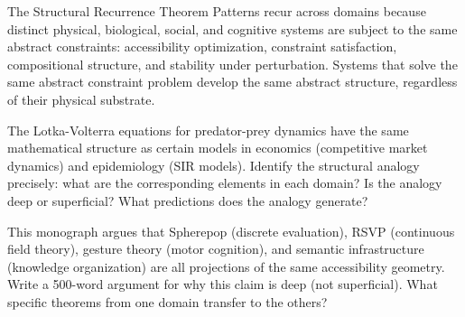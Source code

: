 \begin{namedthm}{The Structural Recurrence Theorem}
  Patterns recur across domains because distinct physical, biological,
  social, and cognitive systems are subject to the same abstract
  constraints: accessibility optimization, constraint satisfaction,
  compositional structure, and stability under perturbation.
  Systems that solve the same abstract constraint problem develop
  the same abstract structure, regardless of their physical substrate.
\end{namedthm}

\begin{exercise}
  The Lotka-Volterra equations for predator-prey dynamics have the
  same mathematical structure as certain models in economics
  (competitive market dynamics) and epidemiology (SIR models).
  Identify the structural analogy precisely: what are the corresponding
  elements in each domain? Is the analogy deep or superficial?
  What predictions does the analogy generate?
\end{exercise}

\begin{exercise}
  This monograph argues that Spherepop (discrete evaluation),
  RSVP (continuous field theory), gesture theory (motor cognition),
  and semantic infrastructure (knowledge organization) are all
  projections of the same accessibility geometry. Write a 500-word
  argument for why this claim is deep (not superficial). What specific
  theorems from one domain transfer to the others?
\end{exercise}
